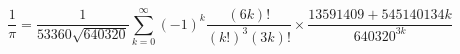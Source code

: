 \[
\frac{1}{\pi}=\frac{1}{53360\sqrt{640320}}\sum_{k = 0}^{\infty}(-1)^k\frac{(6k)!}{(k!)^3(3k)!}\times\frac{13591409 + 545140134k}{640320^{3k}}
\]
